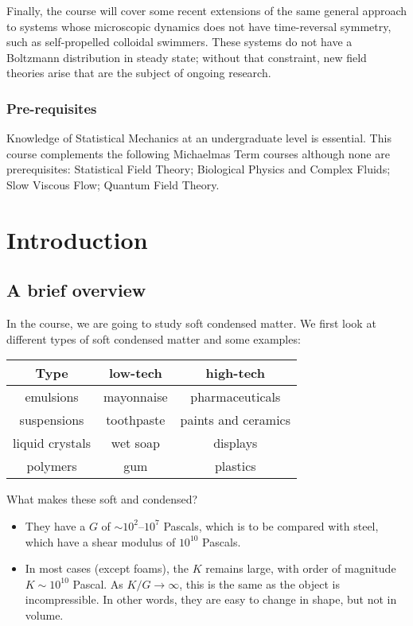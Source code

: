 \documentclass[a4paper]{article}
\begin{document}
{Finally, the course will cover some recent extensions of the same general approach to systems whose microscopic dynamics does not have time-reversal symmetry, such as self-propelled colloidal swimmers. These systems do not have a Boltzmann distribution in steady state; without that constraint, new field theories arise that are the subject of ongoing research.
\subsubsection*{Pre-requisites}
Knowledge of Statistical Mechanics at an undergraduate level is essential. This course complements the following Michaelmas Term courses although none are prerequisites: Statistical Field Theory; Biological Physics and Complex Fluids; Slow Viscous Flow; Quantum Field Theory.
}
\tableofcontents

\section{Introduction}
\subsection{A brief overview}
In the course, we are going to study soft condensed matter. We first look at different types of soft condensed matter and some examples:
\begin{center}
  \begin{tabular}{ccc}
    \toprule
    Type & low-tech & high-tech\\
    \midrule
    emulsions & mayonnaise & pharmaceuticals \\
    suspensions & toothpaste & paints and ceramics\\
    liquid crystals & wet soap & displays \\
    polymers & gum & plastics\\
    \bottomrule
  \end{tabular}
\end{center}
What makes these soft and condensed?
\begin{itemize}
  \item They have a  $G$ of $\sim 10^2$--$10^7$ Pascals, which is to be compared with steel, which have a shear modulus of $10^{10}$ Pascals.

  \item In most cases (except foams), the  $K$ remains large, with order of magnitude $K \sim 10^{10}$ Pascal. As $K/G \to \infty$, this is the same as the object is incompressible. In other words, they are easy to change in shape, but not in volume.
\end{itemize}
\end{document}
